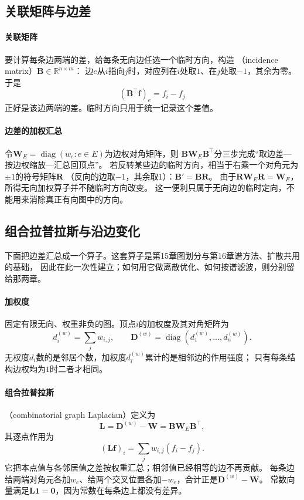 \subsection{关联矩阵与边差}

\paragraph{关联矩阵}
要计算每条边两端的差，给每条无向边任选一个临时方向，构造
（incidence matrix）$\bm B\in\mathbb R^{n\times m}$：
边$e$从$i$指向$j$时，对应列在$i$处取$1$、在$j$处取$-1$，其余为零。
于是
\[
  (\bm B^\top\bm f)_e=f_i-f_j
\]
正好是该边两端的差。临时方向只用于统一记录这个差值。

\paragraph{边差的加权汇总}
令$\bm W_E=\operatorname{diag}(w_e:e\in E)$为边权对角矩阵，则
$\bm B\bm W_E\bm B^\top$分三步完成“取边差—按边权缩放—汇总回顶点”。
若反转某些边的临时方向，相当于右乘一个对角元为$\pm1$的符号矩阵$\bm R$
（反向的边取$-1$，其余取$1$）：$\bm B'=\bm B\bm R$。
由于$\bm R\bm W_E\bm R=\bm W_E$，所得无向加权算子并不随临时方向改变。
这一便利只属于无向边的临时定向，不能用来消除真正有向图中的方向。

\subsection{组合拉普拉斯与沿边变化}

下面把边差汇总成一个算子。这套算子是第15章图划分与第16章谱方法、扩散共用的基础，
因此在此一次性建立；如何用它做离散优化、如何按谱滤波，则分别留给那两章。

\paragraph{加权度}
固定有限无向、权重非负的图。顶点$i$的加权度及其对角矩阵为
\[
  d_i^{(w)}=\sum_j w_{i,j},\qquad
  \bm D^{(w)}=\operatorname{diag}(d_1^{(w)},\ldots,d_n^{(w)}).
\]
无权度$d_i$数的是邻居个数，加权度$d_i^{(w)}$累计的是相邻边的作用强度；
只有每条结构边权均为$1$时二者才相同。

\paragraph{组合拉普拉斯}
（combinatorial graph Laplacian）定义为
\begin{equation}
  \bm L=\bm D^{(w)}-\bm W=\bm B\bm W_E\bm B^\top,
  \label{eq:graph-theory-combinatorial-laplacian}
\end{equation}
其逐点作用为
\[
  (\bm L\bm f)_i=\sum_j w_{i,j}(f_i-f_j).
\]
它把本点值与各邻居值之差按权重汇总；相邻值已经相等的边不再贡献。
每条边给两端对角元各加$w_e$、给两个交叉位置各加$-w_e$，合计正是$\bm D^{(w)}-\bm W$。
常数向量满足$\bm L\bm 1=\bm 0$，因为常数在每条边上都没有差异。

